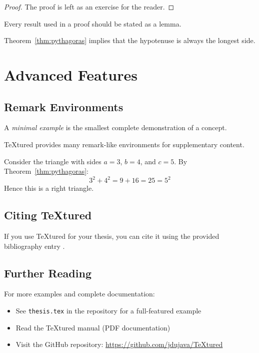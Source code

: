 \documentclass[12pt,a4paper]{textured}
\begin{document}
\begin{proof}
  The proof is left as an exercise for the reader.
\end{proof}

\begin{lemma}
  Every result used in a proof should be stated as a lemma.
\end{lemma}

\begin{corollary}
  Theorem~\ref{thm:pythagoras} implies that the hypotenuse is always the longest side.
\end{corollary}

\chapter{Advanced Features}

\section{Remark Environments}

\begin{definition}
  A \emph{minimal example} is the smallest complete demonstration of a concept.
\end{definition}

\begin{remark}
  TeXtured provides many remark-like environments for supplementary content.
\end{remark}

\begin{example}
  Consider the triangle with sides $a=3$, $b=4$, and $c=5$. By Theorem~\ref{thm:pythagoras}:
  \[
    3^2 + 4^2 = 9 + 16 = 25 = 5^2
  \]
  Hence this is a right triangle.
\end{example}

\section{Citing TeXtured}

If you use TeXtured for your thesis, you can cite it using the provided bibliography entry \autocite{TeXtured}.

\section{Further Reading}

For more examples and complete documentation:
\begin{itemize}
  \item See \texttt{thesis.tex} in the repository for a full-featured example
  \item Read the TeXtured manual (PDF documentation)
  \item Visit the GitHub repository: \url{https://github.com/jdujava/TeXtured}
\end{itemize}

\backmatter

\end{document}
